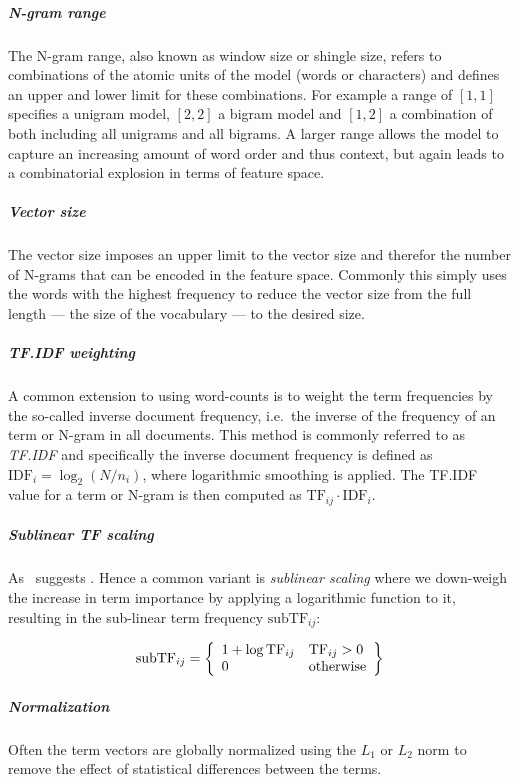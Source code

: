 \subparagraph{N-gram range} The N-gram range, also known as window size or shingle size, refers to combinations of the atomic units of the model (words or characters) and defines an upper and lower limit for these combinations. For example a range of $[1,1]$ specifies a unigram model, $[2,2]$ a bigram model and $[1,2]$ a combination of both including all unigrams and all bigrams.
A larger range allows the model to capture an increasing amount of word order and thus context, but again leads to a combinatorial explosion in terms of feature space.

\subparagraph{Vector size} The vector size imposes an upper limit to the vector size and therefor the number of N-grams that can be encoded in the feature space. Commonly this simply uses the words with the highest frequency to reduce the vector size from the full length --- the size of the vocabulary --- to the desired size.

\subparagraph{TF.IDF weighting}
\label{subp:TF.IDF weighting}
A common extension to using word-counts is to weight the term frequencies by the so-called inverse document frequency, i.e.\ the inverse of the frequency of an term or N-gram in all documents. This method is commonly referred to as \emph{TF.IDF} and specifically the inverse document frequency is defined as $\text{IDF}_i = \log_2 (N/n_i)$, where logarithmic smoothing is applied. The TF.IDF value for a term or N-gram is then computed as $\text{TF}_{ij} \cdot \text{IDF}_i$.

\subparagraph{Sublinear TF scaling}
\label{subp:Sublinear TF scaling}
 As~\cite[Chapter 6.4.1, p.~126]{Manning:2008aa} suggests . Hence a common variant is \emph{sublinear scaling} where we down-weigh the increase in term importance by applying a logarithmic function to it, resulting in the sub-linear term frequency $\text{subTF}_{ij}$:

\begin{displaymath}
  \text{subTF}_{ij} = \left \{ \begin{array}{l l} 1+\log \text{TF}_{ij} & \text{TF}_{ij} > 0 \\
  0 & \text{otherwise}
\end{array} \right \}
\end{displaymath}

\subparagraph{Normalization} Often the term vectors are globally normalized using the $L_1$ or $L_2$ norm to remove the effect of statistical differences between the terms.

